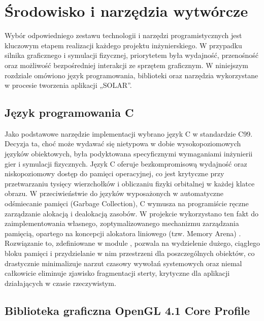 \chapter{Środowisko i narzędzia wytwórcze}

 Wybór odpowiedniego zestawu technologii i narzędzi programistycznych jest kluczowym etapem realizacji każdego projektu inżynierskiego. 
 W przypadku silnika graficznego i symulacji fizycznej, priorytetem była wydajność, przenośność oraz możliwość bezpośredniej interakcji ze sprzętem graficznym.
  W niniejszym rozdziale omówiono język programowania, biblioteki oraz narzędzia wykorzystane w procesie tworzenia aplikacji „SOLAR”.

    \section{Język programowania C}

     Jako podstawowe narzędzie implementacji wybrano język C w standardzie C99.
     Decyzja ta, choć może wydawać się nietypowa w dobie wysokopoziomowych języków obiektowych, była podyktowana specyficznymi wymaganiami inżynierii gier i symulacji fizycznych. 
     Język C oferuje bezkompromisową wydajność oraz niskopoziomowy dostęp do pamięci operacyjnej, co jest krytyczne przy przetwarzaniu tysięcy wierzchołków i obliczaniu fizyki orbitalnej w każdej klatce obrazu. 
     W przeciwieństwie do języków wyposażonych w automatyczne odśmiecanie pamięci (Garbage Collection), C wymusza na programiście ręczne zarządzanie alokacją i dealokacją zasobów. 
     W projekcie wykorzystano ten fakt do zaimplementowania własnego, zoptymalizowanego mechanizmu zarządzania pamięcią, opartego na koncepcji alokatora liniowego (tzw. Memory Arena) \cite{article_berger_custom_allocators, article_wilson_memory_management}.
     Rozwiązanie to, zdefiniowane w module , pozwala na wydzielenie dużego, ciągłego bloku pamięci i przydzielanie w nim przestrzeni dla poszczególnych obiektów, co drastycznie minimalizuje narzut czasowy wywołań systemowych oraz niemal całkowicie eliminuje zjawisko fragmentacji sterty, krytyczne dla aplikacji działających w czasie rzeczywistym.

     \newpage

    \section{Biblioteka graficzna OpenGL 4.1 Core Profile}

